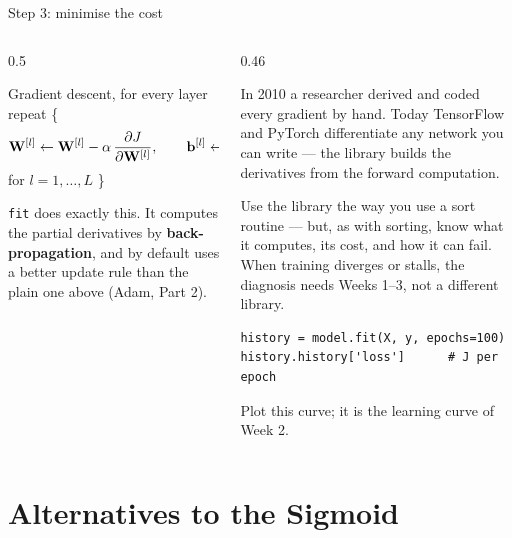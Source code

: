 \documentclass[aspectratio=169,10pt]{beamer}
\begin{document}
\begin{frame}[fragile]{Step 3: minimise the cost}
  \begin{columns}[T,onlytextwidth]
    \begin{column}{0.5\textwidth}
      \begin{block}{Gradient descent, for every layer}
        repeat \{
        \[ \mathbf{W}^{[l]} \leftarrow \mathbf{W}^{[l]} - \alpha\,\frac{\partial J}{\partial \mathbf{W}^{[l]}},\qquad
           \mathbf{b}^{[l]} \leftarrow \mathbf{b}^{[l]} - \alpha\,\frac{\partial J}{\partial \mathbf{b}^{[l]}} \]
        for $l=1,\dots,L$ \}
      \end{block}
      \footnotesize
      \texttt{fit} does exactly this. It computes the partial derivatives by
      \textbf{back-propagation}, and by default uses a better update rule than the plain one
      above (Adam, Part 2).
    \end{column}
    \begin{column}{0.46\textwidth}
      \footnotesize
      \begin{keyidea}
        In 2010 a researcher derived and coded every gradient by hand. Today TensorFlow and
        PyTorch differentiate any network you can write --- the library builds the
        derivatives from the forward computation.
      \end{keyidea}
      \begin{pitfall}
        \footnotesize Use the library the way you use a sort routine --- but, as with
        sorting, know what it computes, its cost, and how it can fail. When training
        diverges or stalls, the diagnosis needs Weeks 1--3, not a different library.
      \end{pitfall}
\begin{lstlisting}
history = model.fit(X, y, epochs=100)
history.history['loss']      # J per epoch
\end{lstlisting}
      Plot this curve; it is the learning curve of Week 2.
    \end{column}
  \end{columns}
\end{frame}

\section{Alternatives to the Sigmoid}
\end{document}
